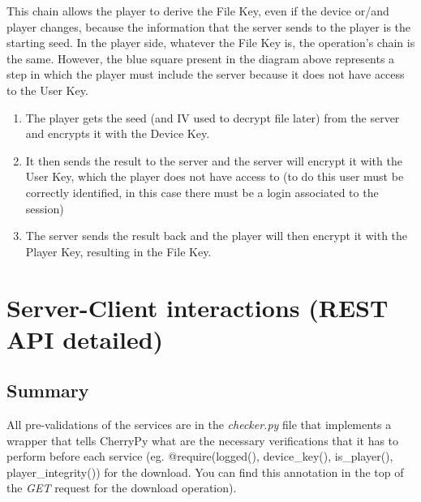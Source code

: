 \documentclass[11pt,a4paper]{report}
\begin{document}
This chain allows the player to derive the File Key, even if the device or/and player changes, because the information that the server sends to the player is the starting seed.
\newline In the player side, whatever the File Key is, the operation's chain is the same. However, the blue square present in the diagram above represents a step in which the player must include the server because it does not have access to the User Key.
\begin{enumerate}
  \item The player gets the seed (and IV used to decrypt file later) from the server and encrypts it with the Device Key.
  \item It then sends the result to the server and the server will encrypt it with the User Key, which the player does not have access to (to do this user must be correctly identified, in this case there must be a login associated to the session)
  \item The server sends the result back and the player will then encrypt it with the Player Key, resulting in the File Key.
\end{enumerate}

\chapter{Server-Client interactions (REST API detailed)}

\section{Summary}
All pre-validations of the services are in the \emph{checker.py} file that implements a wrapper that tells CherryPy what are the necessary verifications that it has to perform before each service (eg. @require(logged(), device\_key(), is\_player(), player\_integrity()) for the download. You can find this annotation in the top of the \emph{GET} request for the download operation).
\end{document}
